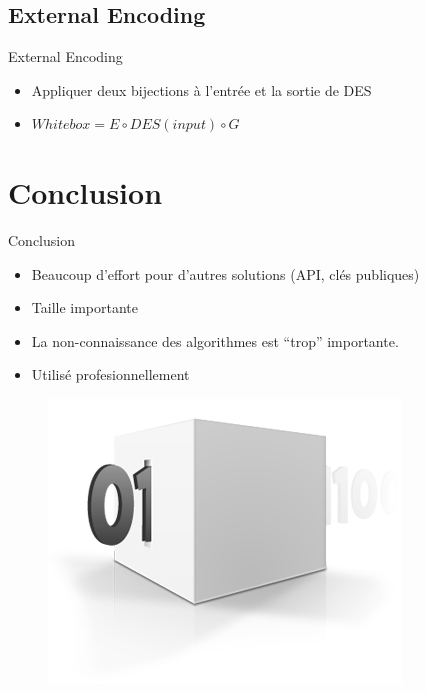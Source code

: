 \documentclass{beamer}
\begin{document}
\subsection{External Encoding}

\begin{frame}{External Encoding}

  \begin{center}
    \begin{itemize}
    \item Appliquer deux bijections à l'entrée et la sortie de DES
    \item $Whitebox = E \circ DES(input) \circ G$
    \end{itemize}
  \end{center}

\end{frame}

\section{Conclusion}

\begin{frame}{Conclusion}
  
  \begin{itemize}
  \item Beaucoup d'effort pour d'autres solutions (API, clés publiques)
  \item Taille importante
  \item La non-connaissance des algorithmes est ``trop'' importante.
  \item Utilisé profesionnellement
  \end{itemize}

  \begin{figure}[h]
    \centering
    \includegraphics[scale=0.6]{./images/conclusion.png}
  \end{figure}

\end{frame}
\end{document}

